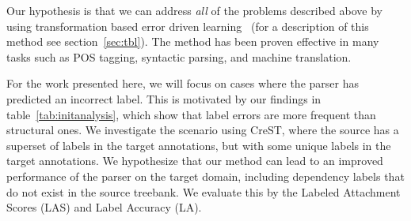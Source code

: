 Our hypothesis is that we can address \textit{all} of the problems described above by using transformation based error driven learning~\cite{Brill:1995:TEL:218355.218367} (for a description of  this method see section~\ref{sec:tbl}). The method has been proven effective in many  tasks such as POS tagging, syntactic parsing, and machine translation. 
 





For the work presented here, we will focus on cases where the parser has predicted an incorrect label. This is motivated by our findings in table~\ref{tab:initanalysis}, which show that label errors are more frequent than structural ones. %
We investigate the scenario using CreST, where the source has a superset of  labels in the target annotations, but with some unique labels in the target annotations. We hypothesize that our method can lead to an improved performance of the parser on the target domain, including dependency labels that do not exist in the source treebank. We evaluate this by the Labeled Attachment Scores (LAS) and Label Accuracy (LA). %

